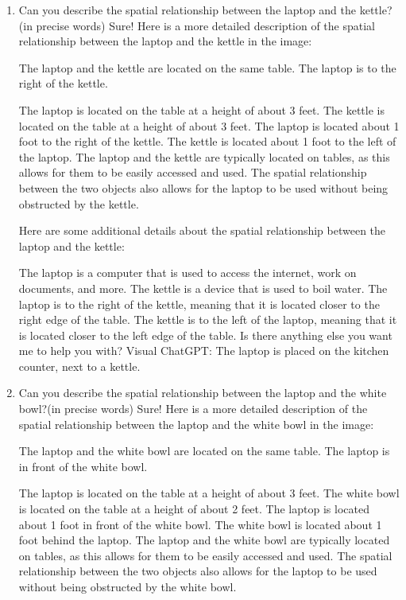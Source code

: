\begin{enumerate}
    \item Can you describe the spatial relationship between the laptop and the kettle?(in precise words)
    \subitem Sure! Here is a more detailed description of the spatial relationship between the laptop and the kettle in the image:

    The laptop and the kettle are located on the same table. The laptop is to the right of the kettle.
    
    The laptop is located on the table at a height of about 3 feet.
    The kettle is located on the table at a height of about 3 feet.
    The laptop is located about 1 foot to the right of the kettle.
    The kettle is located about 1 foot to the left of the laptop.
    The laptop and the kettle are typically located on tables, as this allows for them to be easily accessed and used. The spatial relationship between the two objects also allows for the laptop to be used without being obstructed by the kettle.
    
    Here are some additional details about the spatial relationship between the laptop and the kettle:
    
    The laptop is a computer that is used to access the internet, work on documents, and more.
    The kettle is a device that is used to boil water.
    The laptop is to the right of the kettle, meaning that it is located closer to the right edge of the table.
    The kettle is to the left of the laptop, meaning that it is located closer to the left edge of the table.
    Is there anything else you want me to help you with?
    \subitem Visual ChatGPT: The laptop is placed on the kitchen counter, next to a kettle.
    \item Can you describe the spatial relationship between the laptop and the white bowl?(in precise words)
    \subitem 
    Sure! Here is a more detailed description of the spatial relationship between the laptop and the white bowl in the image:
    
    The laptop and the white bowl are located on the same table. The laptop is in front of the white bowl.
    
    The laptop is located on the table at a height of about 3 feet.
    The white bowl is located on the table at a height of about 2 feet.
    The laptop is located about 1 foot in front of the white bowl.
    The white bowl is located about 1 foot behind the laptop.
    The laptop and the white bowl are typically located on tables, as this allows for them to be easily accessed and used. The spatial relationship between the two objects also allows for the laptop to be used without being obstructed by the white bowl.
    

\end{enumerate}
